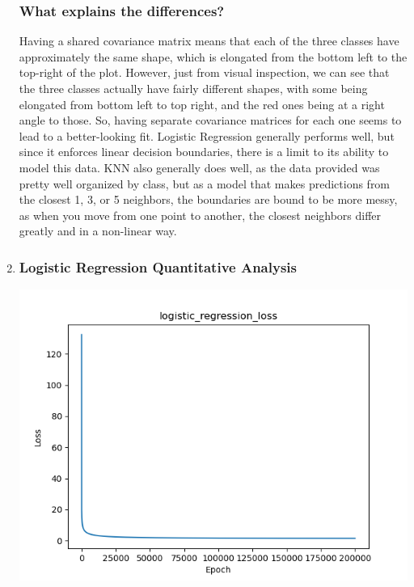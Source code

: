 \documentclass[submit]{harvardml}
\begin{document}
\begin{enumerate}
        \subsubsection*{What explains the differences?}
        Having a shared covariance matrix means that each of the three classes have approximately the same shape, which is elongated from the bottom left to the top-right of the plot. However, just from visual inspection, we can see that the three classes actually have fairly different shapes, with some being elongated from bottom left to top right, and the red ones being at a right angle to those. So, having separate covariance matrices for each one seems to lead to a better-looking fit. Logistic Regression generally performs well, but since it enforces linear decision boundaries, there is a limit to its ability to model this data. KNN also generally does well, as the data provided was pretty well organized by class, but as a model that makes predictions from the closest 1, 3, or 5 neighbors, the boundaries are bound to be more messy, as when you move from one point to another, the closest neighbors differ greatly and in a non-linear way.

        \item \subsubsection*{Logistic Regression Quantitative Analysis}

        \begin{center}
            \includegraphics[scale=.6]{solutions/logistic_regression_loss.png}
        \end{center}


\end{enumerate}
\end{document}
